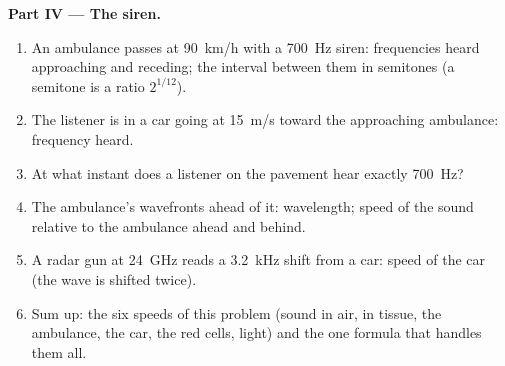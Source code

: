 \begin{problem}
\medskip
\noindent\textbf{Part IV --- The siren.}
\begin{enumerate}[resume]
  \item An ambulance passes at \qty{90}{km/h} with a \qty{700}{Hz} siren:
        frequencies heard approaching and receding; the interval
        between them in semitones (a semitone is a ratio $2^{1/12}$).
  \item The listener is in a car going at \qty{15}{m/s} toward the
        approaching ambulance: frequency heard.
  \item At what instant does a listener on the pavement hear exactly
        \qty{700}{Hz}?
  \item The ambulance's wavefronts ahead of it: wavelength; speed of
        the sound relative to the ambulance ahead and behind.
  \item A radar gun at \qty{24}{GHz} reads a \qty{3.2}{kHz} shift from a car:
        speed of the car (the wave is shifted twice).
  \item Sum up: the six speeds of this problem (sound in air, in
        tissue, the ambulance, the car, the red cells, light) and the
        one formula that handles them all.
\end{enumerate}
\end{problem}

